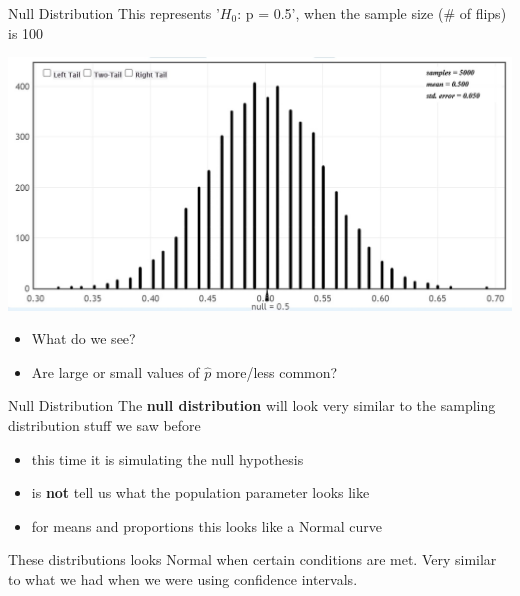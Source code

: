 \documentclass{beamer}
\begin{document}
\begin{frame}{Null Distribution}
This represents '$H_0$: p = 0.5', when the sample size (\# of flips) is 100
\begin{center}
    \includegraphics[scale=.55]{img/coin_null_distr2.jpg}
\end{center}
\begin{itemize}
    \item What do we see?
    \item Are large or small values of $\hat{p}$ more/less common?
\end{itemize}
\end{frame}

\begin{frame}{Null Distribution}
The \textbf{null distribution} will look very similar to the sampling distribution stuff we saw before
\begin{itemize}
    \item this time it is simulating the null hypothesis
    \item is \textbf{not} tell us what the population parameter looks like
    \item for means and proportions this looks like a Normal curve
\end{itemize} \vspace{8mm}

These distributions looks Normal when certain conditions are met. Very similar to what we had when we were using confidence intervals.
\end{frame}
\end{document}
